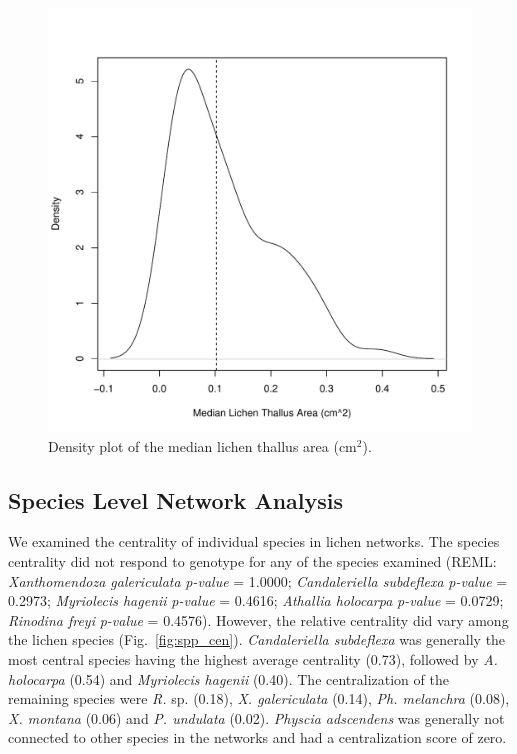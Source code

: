 \documentclass[11pt,onecolumn,lineno]{olplainarticle}
\begin{document}
\begin{figure}[ht]
\centering
\includegraphics[width=\linewidth]{figures/xg_size.pdf}
\caption{Density plot of the median lichen thallus area (cm$^2$). }
\label{fig:SI_xg_median}
\end{figure}




\subsection*{Species Level Network Analysis}


We examined the centrality of individual species in lichen
networks. The species centrality did not respond to genotype for any
of the species examined (REML: \textit{Xanthomendoza galericulata}
\textit{p-value} = 1.0000; \textit{Candaleriella subdeflexa}
\textit{p-value} = 0.2973; \textit{Myriolecis hagenii} \textit{p-value} =
0.4616; \textit{Athallia holocarpa} \textit{p-value} = 0.0729;
\textit{Rinodina freyi} \textit{p-value} = 0.4576). However, the
relative centrality did vary among the lichen species
(Fig.~\ref{fig:spp_cen}). \textit{Candaleriella subdeflexa} was
generally the most central species having the highest average
centrality (0.73), followed by \textit{A. holocarpa} (0.54) and
\textit{Myriolecis hagenii} (0.40). The centralization of the remaining
species were \textit{R.}  sp. (0.18), \textit{X. galericulata} (0.14),
\textit{Ph. melanchra} (0.08), \textit{X. montana} (0.06) and
\textit{P. undulata} (0.02). \textit{Physcia adscendens} was
generally not connected to other species in the networks and had a
centralization score of zero.
\end{document}
